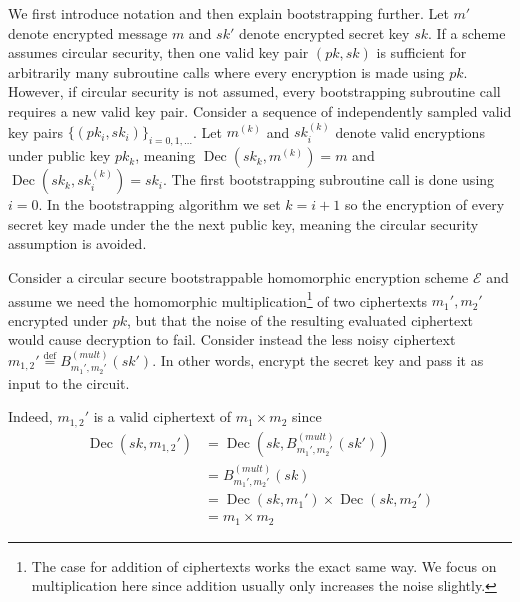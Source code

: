 We first introduce notation and then explain bootstrapping further. Let $m'$ denote encrypted message $m$ and $sk'$ denote encrypted secret key $sk$. If a scheme assumes circular security, then one valid key pair $(pk,sk)$ is sufficient for arbitrarily many subroutine calls where every encryption is made using $pk$. However, if circular security is not assumed, every bootstrapping subroutine call requires a new valid key pair. Consider a sequence of independently sampled valid key pairs $\{(pk_i,sk_i)\}_{i = 0, 1, \dots}$. Let $m^{(k)}$ and $sk_i^{(k)}$ denote valid encryptions under public key $pk_k$, meaning $\operatorname{Dec}(sk_k,m^{(k)}) = m$ and $\operatorname{Dec}(sk_k,sk_i^{(k)}) = sk_i$. The first bootstrapping subroutine call is done using $i = 0$. In the bootstrapping algorithm we set $k = i+1$ so the encryption of every secret key made under the the next public key, meaning the circular security assumption is avoided. 


Consider a circular secure bootstrappable homomorphic encryption scheme $\mathcal{E}$ and assume we need the homomorphic multiplication\footnote{The case for addition of ciphertexts works the exact same way. We focus on multiplication here since addition usually only increases the noise slightly.} of two ciphertexts $m_1', m_2'$ encrypted under $pk$, but that the noise of the resulting evaluated ciphertext would cause decryption to fail. Consider instead the less noisy ciphertext $m_{1,2}' \stackrel{\mathrm{def}}{=} B_{m_1',m_2'}^{(mult)}(sk')$. In other words, encrypt the secret key and pass it as input to the circuit.

Indeed, $m_{1,2}'$ is a valid ciphertext of $m_1 \times m_2$ since 
\begin{equation*}
    \begin{aligned}
        \operatorname{Dec}(sk, m_{1,2}') &= \operatorname{Dec}(sk, B_{m_1',m_2'}^{(mult)}(sk'))\\
        &= B_{m_1',m_2'}^{(mult)}(sk) \\
        &= \operatorname{Dec}(sk, m_1') \times \operatorname{Dec}(sk, m_2')\\
        &= m_1 \times m_2
    \end{aligned}
\end{equation*}

